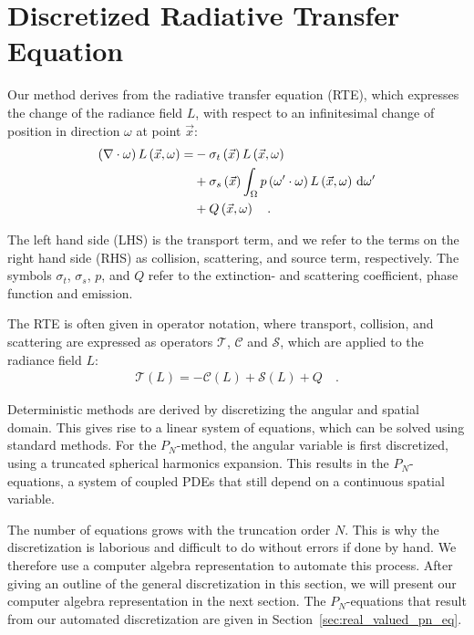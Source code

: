 \section{Discretized Radiative Transfer Equation}
\label{sec:discretized_rte}

Our method derives from the radiative transfer equation (RTE), which expresses the change of the radiance field $L$, with respect to an infinitesimal change of position in direction $\omega$ at point $\vec{x}$:
\begin{align}
\left(\nabla\cdot\omega\right)L\left(\vec{x}, \omega \right)
=&
-\sigma_t\left(\vec{x}\right) L\left(\vec{x}, \omega \right)\nonumber\\
&
+\sigma_s\left(\vec{x}\right) \int_{\Omega}
{
p\left(\omega'\cdot\omega\right)L\left(\vec{x}, \omega \right)\,\mathrm{d}\omega'
}\nonumber\\
&
+Q\left(\vec{x}, \omega\right)\nonumber
\quad .
\label{eq:rte}
\end{align}

The left hand side (LHS) is the transport term, and we refer to the terms on the right hand side (RHS) as collision, scattering, and source term, respectively. The symbols $\sigma_t$, $\sigma_s$, $p$, and $Q$ refer to the extinction- and scattering coefficient, phase function and emission.

The RTE is often given in operator notation, where transport, collision, and scattering are expressed as operators $\mathcal{T}$, $\mathcal{C}$ and $\mathcal{S}$, which are applied to the radiance field $L$:
\begin{align}
\mathcal{T}\left(L\right) = -\mathcal{C}\left(L\right) + \mathcal{S}\left(L\right) + Q
\quad .
\end{align}

Deterministic methods are derived by discretizing the angular and spatial domain. This gives rise to a linear system of equations, which can be solved using standard methods. For the $P_N$-method, the angular variable is first discretized, using a truncated spherical harmonics expansion. This results in the $P_N$-equations, a system of coupled PDEs that still depend on a continuous spatial variable.

The number of equations grows with the truncation order $N$. This is why the discretization is laborious and difficult to do without errors if done by hand. We therefore use a computer algebra representation to automate this process. After giving an outline of the general discretization in this section, we will present our computer algebra representation in the next section. The $P_N$-equations that result from our automated discretization are given in Section~\ref{sec:real_valued_pn_eq}. 

